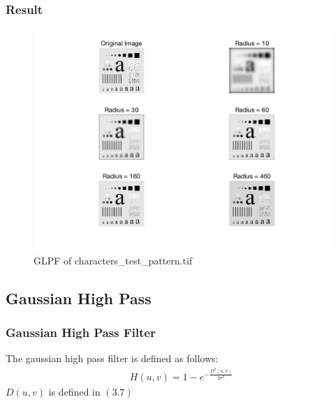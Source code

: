 \documentclass[11pt,oneside]{book}
\begin{document}
\subsubsection{Result}
\begin{figure}[!htb]
   \centering  
   \includegraphics[width=1.0\textwidth]{images/3/GLPF.jpg}
   \caption{GLPF of characters\_test\_pattern.tif}  
\end{figure}

\subsection{Gaussian High Pass}
\subsubsection{Gaussian High Pass Filter}
The gaussian high pass filter is defined as follows:\\
\begin{align}
H(u,v)=1-e^{-\frac{D^2(u,v)}{2\sigma^2}}
\end{align}
$D(u,v)$ is defined in $(3.7)$
\end{document}
